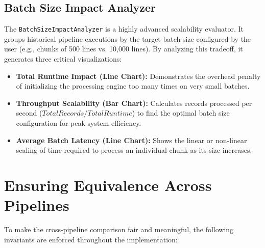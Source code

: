 \documentclass[11pt,a4paper]{article}
\begin{document}
\subsection{Batch Size Impact Analyzer}
The \texttt{BatchSizeImpactAnalyzer} is a highly advanced scalability evaluator. It groups historical pipeline executions by the target batch size configured by the user (e.g., chunks of 500 lines vs. 10,000 lines). By analyzing this tradeoff, it generates three critical visualizations:
\begin{itemize}
    \item \textbf{Total Runtime Impact (Line Chart):} Demonstrates the overhead penalty of initializing the processing engine too many times on very small batches.
    \item \textbf{Throughput Scalability (Bar Chart):} Calculates records processed per second ($Total Records / Total Runtime$) to find the optimal batch size configuration for peak system efficiency.
    \item \textbf{Average Batch Latency (Line Chart):} Shows the linear or non-linear scaling of time required to process an individual chunk as its size increases.
\end{itemize}

\vspace{5cm} %

\section{Ensuring Equivalence Across Pipelines}

To make the cross-pipeline comparison fair and meaningful, the following invariants are enforced throughout the implementation:
\end{document}
